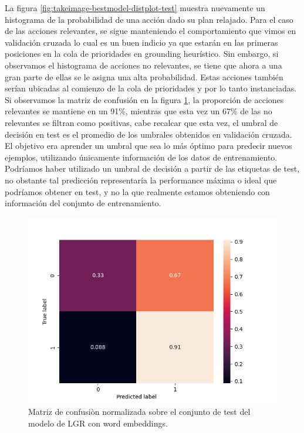 La figura \ref{fig:takeimage-bestmodel-distplot-test} muestra nuevamente
un histograma de la probabilidad de una acción dado su plan relajado. Para el caso de
las acciones relevantes, se sigue manteniendo el comportamiento que vimos en
validación cruzada lo cual es un buen indicio ya que estarán en las primeras
posiciones en la cola de prioridades en grounding heurístico. Sin embargo, si
observamos el histograma de acciones no relevantes, se tiene que ahora a una
gran parte de ellas se le asigna una alta probabilidad. Estas acciones también
serían ubicadas al comienzo de la cola de prioridades y por lo tanto
instanciadas. Si observamos la matriz de confusión en la figura
\ref{fig:takeimage-bestmodel-cm-test}, la proporción de acciones relevantes se
mantiene en un 91\%, mientras que esta vez un 67\% de las no relevantes se
filtran como positivas, cabe recalcar que esta vez, el umbral de decisión en
test es el promedio de los umbrales obtenidos en validación cruzada. El objetivo
era aprender un umbral que sea lo más óptimo para predecir nuevos ejemplos,
utilizando únicamente información de los datos de entrenamiento. Podríamos haber
utilizado un umbral de decisión a partir de las etiquetas de test, no obstante
tal predicción representaría la performance máxima o ideal que podríamos obtener
en test, y no la que realmente estamos obteniendo con información del conjunto
de entrenamiento.

\begin{figure}[b!]
    \centering
    \includegraphics[width=\linewidth]{figures/results/word_embeddings/lgr/take_image/lgr_set_6_confusion_matrix_percent.png}
    \caption{Matriz de confusiòn normalizada sobre el conjunto de test del modelo de LGR con word embeddings.}
    \label{fig:takeimage-bestmodel-cm-test}
\end{figure}

